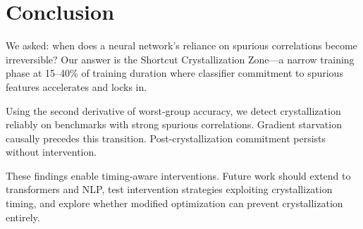 \section{Conclusion}

We asked: when does a neural network's reliance on spurious correlations become irreversible? Our answer is the Shortcut Crystallization Zone---a narrow training phase at 15--40\% of training duration where classifier commitment to spurious features accelerates and locks in.

Using the second derivative of worst-group accuracy, we detect crystallization reliably on benchmarks with strong spurious correlations. Gradient starvation causally precedes this transition. Post-crystallization commitment persists without intervention.

These findings enable timing-aware interventions. Future work should extend to transformers and NLP, test intervention strategies exploiting crystallization timing, and explore whether modified optimization can prevent crystallization entirely.
